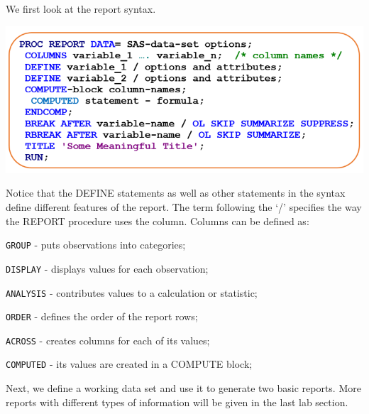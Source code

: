 \documentclass[
]{book}
\begin{document}
We first look at the report syntax.

\begin{center}\includegraphics[width=1\linewidth]{img13/w13-Report-Syntax} \end{center}

Notice that the DEFINE statements as well as other statements in the syntax define different features of the report. The term following the `/' specifies the way the REPORT procedure uses the column. Columns can be defined as:

\texttt{GROUP} - puts observations into categories;

\texttt{DISPLAY} - displays values for each observation;

\texttt{ANALYSIS} - contributes values to a calculation or statistic;

\texttt{ORDER} - defines the order of the report rows;

\texttt{ACROSS} - creates columns for each of its values;

\texttt{COMPUTED} - its values are created in a COMPUTE block;

Next, we define a working data set and use it to generate two basic reports. More reports with different types of information will be given in the last lab section.
\end{document}
